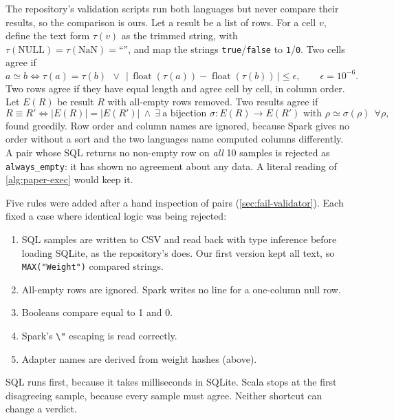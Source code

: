 The repository's validation scripts run both languages but never compare their results, so the comparison is ours.
Let a result be a list of rows. For a cell $v$, define the text form $\tau(v)$ as the trimmed string, with
$\tau(\text{NULL})=\tau(\text{NaN})=\text{``''}$, and map the strings \texttt{true}/\texttt{false} to
\texttt{1}/\texttt{0}. Two cells agree if
\begin{equation}
  a \simeq b \iff \tau(a)=\tau(b)\ \ \lor\ \ \bigl|\,\operatorname{float}(\tau(a))-\operatorname{float}(\tau(b))\,\bigr|
  \le \epsilon,\qquad \epsilon=10^{-6}.
\end{equation}
Two rows agree if they have equal length and agree cell by cell, in column order. Let $E(R)$ be result $R$ with
all-empty rows removed. Two results agree if
\begin{equation}
  R \equiv R' \iff |E(R)|=|E(R')| \ \land\ \exists\ \text{a bijection } \sigma: E(R)\to E(R') \text{ with } \rho \simeq
  \sigma(\rho)\ \ \forall \rho,
\end{equation}
found greedily. Row order and column names are ignored, because Spark gives no order without a sort and the two
languages name computed columns differently. A pair whose SQL returns no non-empty row on \emph{all} 10 samples is
rejected as \texttt{always\_empty}: it has shown no agreement about any data. A literal reading of
\cref{alg:paper-exec} would keep it.

Five rules were added after a hand inspection of pairs (\cref{sec:fail-validator}). Each fixed a case where identical
logic was being rejected:
\begin{enumerate}
\item SQL samples are written to CSV and read back with type inference before loading SQLite, as the repository's
 does. Our first version kept all text, so \texttt{MAX("Weight")} compared strings.
\item All-empty rows are ignored. Spark writes no line for a one-column null row.
\item Booleans compare equal to 1 and 0.
\item Spark's \texttt{\textbackslash"} escaping is read correctly.
\item Adapter names are derived from weight hashes (above).
\end{enumerate}
SQL runs first, because it takes milliseconds in SQLite. Scala stops at the first disagreeing sample, because every
sample must agree. Neither shortcut can change a verdict.

